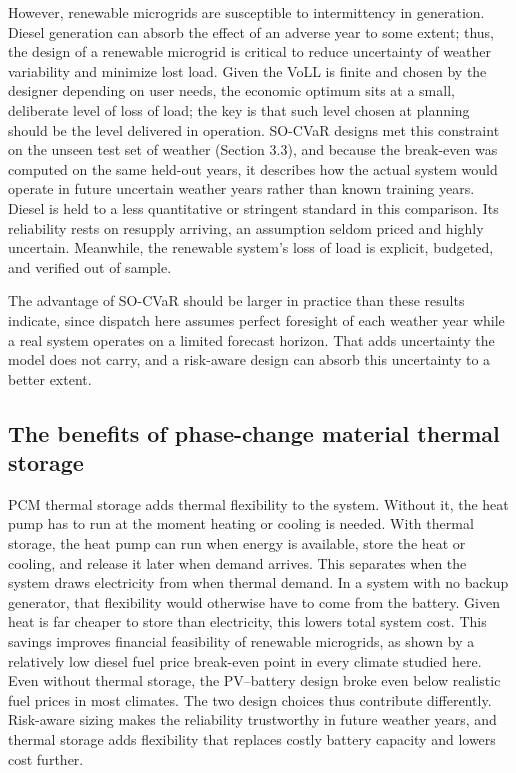 \documentclass[
  journal=large,
  manuscript=article-type,
  year=2020,
  volume=37,
]{cup-journal}
\begin{document}
However, renewable microgrids are susceptible to intermittency in generation. Diesel generation can absorb the effect of  an adverse year to some extent; thus, the design of a renewable microgrid is critical to reduce uncertainty of weather variability and minimize lost load. Given the VoLL is finite and chosen by the designer depending on user needs, the economic optimum sits at a small, deliberate level of loss of load; the key is that such level chosen at planning should be the level delivered in operation. SO-CVaR designs met this constraint on the unseen test set of weather (Section 3.3), and because the break-even was computed on the same held-out years, it describes how the actual system would operate in future uncertain weather years rather than known training years. Diesel is held to a less quantitative or stringent  standard in this comparison. Its reliability rests on resupply arriving, an assumption seldom priced and highly uncertain.  Meanwhile, the renewable system's loss of load is explicit, budgeted, and verified out of sample.

The advantage of SO-CVaR should be larger in practice than these results indicate, since dispatch here assumes perfect foresight of each weather year while a real system operates on a limited forecast horizon. That adds uncertainty the model does not carry, and a risk-aware design can absorb this uncertainty to a better extent.

\subsection{The benefits of phase-change material thermal storage}

PCM thermal storage adds thermal flexibility to the system. Without it, the heat pump has to run at the moment heating or cooling is needed. With thermal storage, the heat pump can run when energy is available, store the heat or cooling, and release it later when demand arrives. This separates when the system draws electricity from when thermal demand. In a system with no backup generator, that flexibility would otherwise have to come from the battery. Given heat is far cheaper to store than electricity, this lowers total system cost. This savings improves financial feasibility of renewable microgrids, as shown by a relatively low diesel fuel price break-even point in every climate studied here. Even without thermal storage, the PV--battery design broke even below realistic fuel prices in most climates. The two design choices thus contribute differently. Risk-aware sizing makes the reliability trustworthy in future weather years, and thermal storage adds flexibility that replaces costly battery capacity and lowers cost further.
\end{document}
